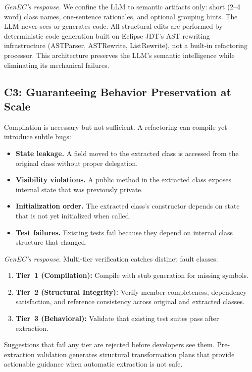 \documentclass[sigconf]{acmart}
\begin{document}
\emph{GenEC's response.}  We confine the LLM to semantic artifacts only: short
(2--4 word) class names, one-sentence rationales, and optional grouping hints.
The LLM never sees or generates code. All structural edits are performed by
deterministic code generation built on Eclipse JDT's AST rewriting
infrastructure (ASTParser, ASTRewrite, ListRewrite), not a built-in
refactoring processor. This architecture preserves the LLM's semantic
intelligence while eliminating its mechanical failures.

\subsection{C3: Guaranteeing Behavior Preservation at Scale}
\label{sec:c3}

Compilation is necessary but not sufficient. A refactoring can compile yet
introduce subtle bugs:
\begin{itemize}
  \item \textbf{State leakage.}  A field moved to the extracted class is
        accessed from the original class without proper delegation.
  \item \textbf{Visibility violations.}  A public method in the extracted class
        exposes internal state that was previously private.
  \item \textbf{Initialization order.}  The extracted class's constructor
        depends on state that is not yet initialized when called.
  \item \textbf{Test failures.}  Existing tests fail because they depend on
        internal class structure that changed.
\end{itemize}

\emph{GenEC's response.}  Multi-tier verification catches distinct fault
classes:
\begin{enumerate}
  \item \textbf{Tier~1 (Compilation):}  Compile with stub generation for
        missing symbols.
  \item \textbf{Tier~2 (Structural Integrity):}  Verify member completeness,
        dependency satisfaction, and reference consistency across original and
        extracted classes.
  \item \textbf{Tier~3 (Behavioral):}  Validate that existing test suites
        pass after extraction.
\end{enumerate}
Suggestions that fail any tier are rejected before developers see them.
Pre-extraction validation generates structural transformation plans that
provide actionable guidance when automatic extraction is not safe.
\end{document}
